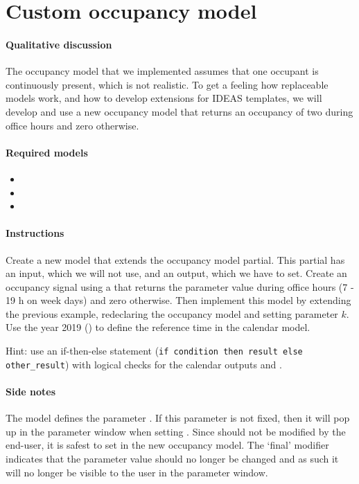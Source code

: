 \documentclass[10pt,a4paper]{article}
\begin{document}
\section{Custom occupancy model}
\paragraph{Qualitative discussion}
The occupancy model that we implemented assumes
that one occupant is continuously present,
which is not realistic.
To get a feeling how replaceable models work,
and how to develop extensions for IDEAS templates,
we will develop and use a new occupancy model
that returns an occupancy of two during
office hours and zero otherwise.

\paragraph{Required models}
\begin{itemize}
\item {}
\item {}
\item {}
\end{itemize}

\paragraph{Instructions}
Create a new model that extends the occupancy model partial.
This partial has an input, which we will not use, and an output, which we have to set.
Create an occupancy signal using a  that
returns the parameter value  during office hours 
(7 - 19 h on week days) and zero otherwise.
Then implement this model by extending the previous example, 
redeclaring the occupancy model and setting parameter $k$.
Use the year 2019 () to define the reference time in the calendar model.

Hint: use an if-then-else statement (\texttt{if condition then result else other\_result}) with logical checks for the calendar outputs  and .

\paragraph{Side notes}
The model  
defines the parameter .
If this parameter is not fixed, then it will pop up in the parameter window when
setting . Since  should not be modified by the end-user,
it is safest to set  in the new occupancy model.
The `final' modifier indicates that the parameter value should no longer be changed
and as such it will no longer be visible to the user in the parameter window.
\end{document}
